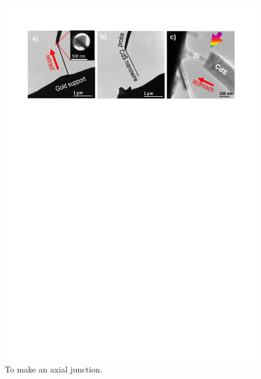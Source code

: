 \begin{figure}  
\includegraphics[width=\textwidth]{figures/figure3_1}
\caption[Making an axial junction.]{To make an axial junction.
\label{fig:fig3_1}}
\end{figure}

